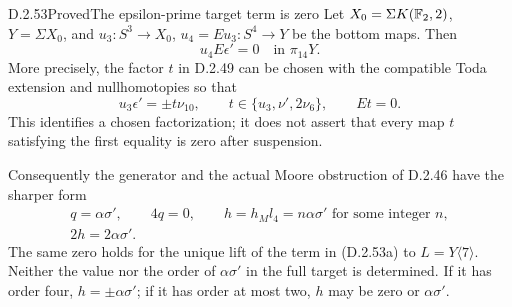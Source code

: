\begin{claim}{D.2.53}{Proved}{The epsilon-prime target term is zero}
Let $X_0=\Sigma K(\mathbb F_2,2)$, $Y=\Sigma X_0$, and
$u_3:S^3\to X_0$, $u_4=Eu_3:S^4\to Y$ be the bottom maps.
Then
\[
                         u_4E\epsilon'=0\quad\text{in }\pi_{14}Y.
                         \tag{D.2.53a}
\]
More precisely, the factor $t$ in D.2.49 can be chosen with
the compatible Toda extension and nullhomotopies so that
\[
 u_3\epsilon'=\pm t\nu_{10},\qquad
 t\in\{u_3,\nu',2\nu_6\},\qquad Et=0.
 \tag{D.2.53b}
\]
This identifies a chosen factorization; it does not assert
that every map $t$ satisfying the first equality is zero
after suspension.

Consequently the generator and the actual Moore obstruction
of D.2.46 have the sharper form
\[
 \begin{gathered}
 q=\alpha\sigma',\qquad 4q=0,\qquad
 h=h_Ml_4=n\alpha\sigma'\text{ for some integer }n,\\
                         2h=2\alpha\sigma'.
 \end{gathered}
 \tag{D.2.53c}
\]
The same zero holds for the unique lift of the term in
\textup{(D.2.53a)} to $L=Y\langle7\rangle$.
Neither the value nor the order of $\alpha\sigma'$ in
the full target is determined.  If it has order four,
$h=\pm\alpha\sigma'$; if it has order at most two,
$h$ may be zero or $\alpha\sigma'$.
\end{claim}
